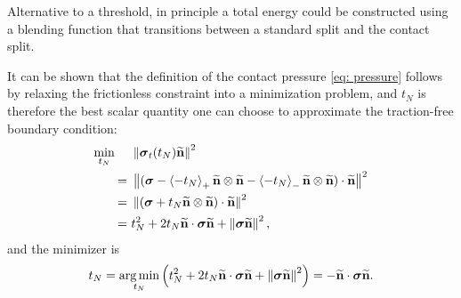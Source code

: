 \begin{remark}
  Alternative to a threshold, in principle a total energy could be constructed using a blending function that transitions between a standard split and the contact split.
\end{remark}

It can be shown that the definition of the contact pressure \eqref{eq: pressure} follows by relaxing the frictionless constraint into a minimization problem, and $t_N$ is therefore the best scalar quantity one can choose to approximate the traction-free boundary condition:
\begin{subequations}
  \begin{align}
    \min\limits_{t_N} \quad & \ \norm{\stress_t(t_N)\xnormal}^2                                                                                    \\
    =                       & \ \norm{(\stress-\macaulay{-t_N}_+\xnormal\otimes\xnormal-\macaulay{-t_N}_- \xnormal\otimes\xnormal)\cdot\xnormal}^2 \\
    =                       & \ \norm{(\stress+t_N \xnormal\otimes\xnormal)\cdot\xnormal}^2                                                        \\
    =                       & \ t_N^2 + 2t_N\xnormal\cdot\stress\xnormal + \norm{\stress\xnormal}^2,                                               
  \end{align}
\end{subequations}
and the minimizer is
\begin{align}
  t_N = \operatorname*{arg\,min}\limits_{t_N} \left( t_N^2 + 2t_N\widetilde{\textbf{n}}\cdot\boldsymbol{\sigma}\widetilde{\textbf{n}} + \left\lVert\boldsymbol{\sigma}\widetilde{\textbf{n}}\right\rVert^2 \right) = -\widetilde{\textbf{n}}\cdot\boldsymbol{\sigma}\widetilde{\textbf{n}} .
\end{align}


